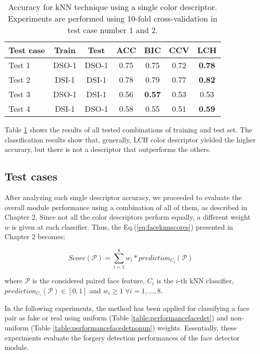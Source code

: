 \begin{table}[h!]
\centering
\begin{tabular}{l c c c c c c} 
\hline \hline 
\textbf{Test case} & \textbf{Train} & \textbf{Test} & \textbf{ACC} & \textbf{BIC} & \textbf{CCV} & \textbf{LCH} \\ [0.5ex]
\hline
Test 1 & DSO-1 & DSO-1 &	0.75 & 0.75	& 0.72 & \textbf{0.78}\\
Test 2 & DSI-1 & DSI-1 &	0.78 & 0.79 & 0.77 & \textbf{0.82}\\
Test 3 &	DSO-1 &	DSI-1 &	0.56 & \textbf{0.57} & 0.53 & 0.53\\
Test 4 &	DSI-1 & DSO-1 & 0.58 & 0.55 & 0.51 & \textbf{0.59}\\ [1ex]
\hline
\end{tabular}
\caption{Accuracy for kNN technique using a single color descriptor. Experiments are performed using 10-fold cross-validation in test case number 1 and 2.}
\label{table:colordescriptorperformance}
\end{table}

Table \ref{table:colordescriptorperformance} shows the results of all tested combinations of training and test set. The classification results show that, generally, LCH color descriptor yielded the higher accurary, but there is not a descriptor that outperforms the others.

\subsection{Test cases}

After analyzing each single descriptor accuracy, we proceeded to evaluate the overall module performance using a combination of all of them, as described in Chapter 2. Since not all the color descriptors perform equally, a different weight $w$ is given at each classifier. Thus, the Eq.(\ref{eq:faceknnscores}) presented in Chapter 2 becomes:

\begin{equation}
Score(\mathcal{P}) = \sum_{i = 1}^{8} w_i * prediction_{C_i}(\mathcal{P})
\end{equation}

where $\mathcal{P}$ is the considered paired face feature, $C_i$ is the $i$-th kNN classifier, $prediction_{C_i}(\mathcal{P}) \in [0, 1]$ and $w_i \geq 1 \; \forall i = 1, \ldots, 8$.

In the following experiments, the  method has been applied for classifying a face pair as fake or real using uniform (Table \ref{table:performancefacedet}) and non-uniform (Table \ref{table:performancefacedetnonun}) weights. Essentially, these experiments evaluate the forgery detection performances of the face detector module.

